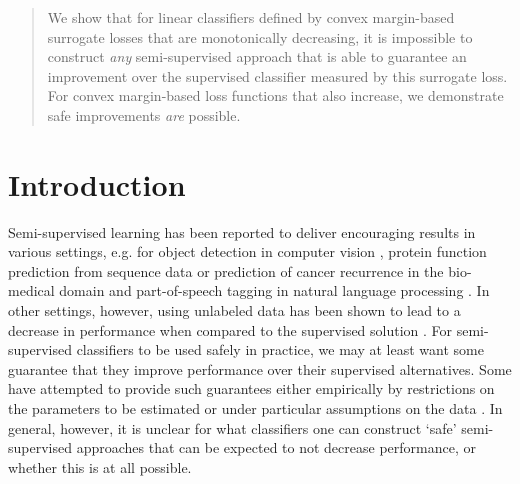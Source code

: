 \documentclass[twoside]{memoir}\usepackage[]{graphicx}\usepackage{xcolor}
\begin{document}
\begin{abstract}
We show that for linear classifiers defined by convex margin-based surrogate losses that are monotonically decreasing,  it is impossible to construct \emph{any} semi-supervised approach that is able to guarantee an improvement over the supervised classifier measured by this surrogate loss. For convex margin-based loss functions that also increase, we demonstrate safe improvements \emph{are} possible.
\end{abstract}

\section{Introduction}

Semi-supervised learning has been reported to deliver encouraging results in various settings, e.g. for object detection in computer vision \citep{Rasmus2015}, protein function prediction from sequence data \citep{Weston2005} or prediction of cancer recurrence \citep{Shi2011} in the bio-medical domain and part-of-speech tagging in natural language processing \citep{Elworthy1994}.  In other settings, however, using unlabeled data has been shown to lead to a decrease in performance when compared to the supervised solution \citep{Elworthy1994, Cozman2006}. For semi-supervised classifiers to be used safely in practice, we may at least want some guarantee that they improve performance over their supervised alternatives. Some have attempted to provide such guarantees either empirically by restrictions on the parameters to be estimated \citep{Loog2010} or under particular assumptions on the data \citep{Li2015}. In general, however, it is unclear for what classifiers one can construct `safe' semi-supervised approaches that can be expected to not decrease performance, or whether this is at all possible.
\end{document}

